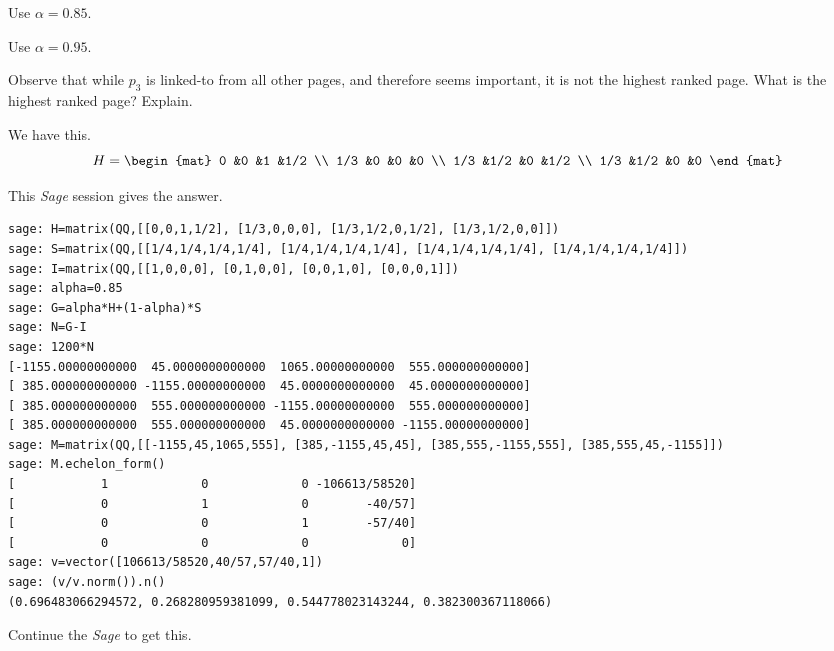 \begin{exercises}
\begin{exparts}
      \item Use $\alpha=0.85$.
      \item Use $\alpha=0.95$.
      \item Observe that while $p_3$ is linked-to from all other pages,
        and therefore seems important, it is not the highest ranked page.
        What is the highest ranked page?
        Explain.
    \end{exparts}
    \begin{answer}
      We have this.
      \begin{equation*}
          H=\begin{mat}
               0     &0    &1    &1/2   \\
               1/3   &0    &0    &0   \\
               1/3   &1/2  &0    &1/2 \\
               1/3   &1/2  &0    &0
          \end{mat}
      \end{equation*}
      \begin{exparts}
        \item This \textit{Sage} session gives the answer.
\begin{lstlisting}
sage: H=matrix(QQ,[[0,0,1,1/2], [1/3,0,0,0], [1/3,1/2,0,1/2], [1/3,1/2,0,0]]) 
sage: S=matrix(QQ,[[1/4,1/4,1/4,1/4], [1/4,1/4,1/4,1/4], [1/4,1/4,1/4,1/4], [1/4,1/4,1/4,1/4]])
sage: I=matrix(QQ,[[1,0,0,0], [0,1,0,0], [0,0,1,0], [0,0,0,1]])
sage: alpha=0.85
sage: G=alpha*H+(1-alpha)*S    
sage: N=G-I
sage: 1200*N                                                                    
[-1155.00000000000  45.0000000000000  1065.00000000000  555.000000000000]
[ 385.000000000000 -1155.00000000000  45.0000000000000  45.0000000000000]
[ 385.000000000000  555.000000000000 -1155.00000000000  555.000000000000]
[ 385.000000000000  555.000000000000  45.0000000000000 -1155.00000000000]
sage: M=matrix(QQ,[[-1155,45,1065,555], [385,-1155,45,45], [385,555,-1155,555], [385,555,45,-1155]]) 
sage: M.echelon_form()
[            1             0             0 -106613/58520]
[            0             1             0        -40/57]
[            0             0             1        -57/40]
[            0             0             0             0]
sage: v=vector([106613/58520,40/57,57/40,1])
sage: (v/v.norm()).n()
(0.696483066294572, 0.268280959381099, 0.544778023143244, 0.382300367118066)
\end{lstlisting}
        \item Continue the \textit{Sage} to get this.

\end{exparts}
\end{answer}
\end{exercises}
